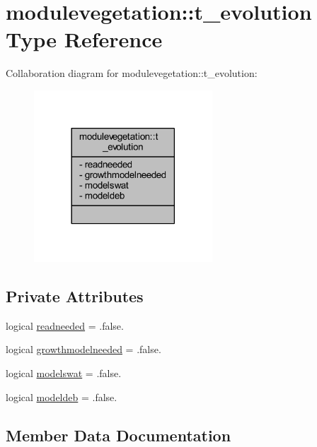 \hypertarget{structmodulevegetation_1_1t__evolution}{}\section{modulevegetation\+:\+:t\+\_\+evolution Type Reference}
\label{structmodulevegetation_1_1t__evolution}


Collaboration diagram for modulevegetation\+:\+:t\+\_\+evolution\+:\nopagebreak
\begin{figure}[H]
\begin{center}
\leavevmode
\includegraphics[width=189pt]{structmodulevegetation_1_1t__evolution__coll__graph}
\end{center}
\end{figure}
\subsection*{Private Attributes}
\begin{DoxyCompactItemize}
\item 
logical \mbox{\hyperlink{structmodulevegetation_1_1t__evolution_a20bcfe39d688fd56fbf0dce39e213f97}{readneeded}} = .false.
\item 
logical \mbox{\hyperlink{structmodulevegetation_1_1t__evolution_a2a2a41c87c00f6fba3afd72e15a601ac}{growthmodelneeded}} = .false.
\item 
logical \mbox{\hyperlink{structmodulevegetation_1_1t__evolution_aba394c40e5d531f7344185a308a79194}{modelswat}} = .false.
\item 
logical \mbox{\hyperlink{structmodulevegetation_1_1t__evolution_a5e890a1c27439f97935faac01c028408}{modeldeb}} = .false.
\end{DoxyCompactItemize}


\subsection{Member Data Documentation}
\mbox{\label{structmodulevegetation_1_1t__evolution_a2a2a41c87c00f6fba3afd72e15a601ac}} 
